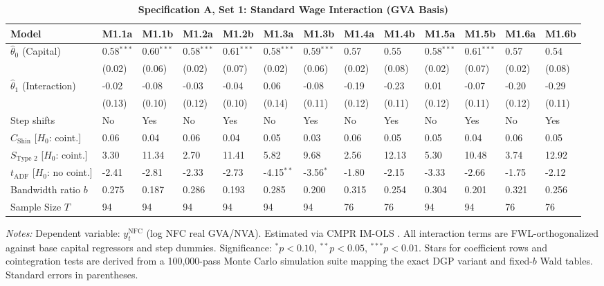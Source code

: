 \FloatBarrier
\begin{table}[h!]
\centering
\caption{\textbf{Specification A, Set 1: Standard Wage Interaction (GVA Basis)}}
\label{tab:specA_set1_gva_app}
\tiny
\setlength{\tabcolsep}{1.5pt}
\begin{tabular}{p{3.2cm}p{1.0cm}p{1.0cm}p{1.0cm}p{1.0cm}p{1.0cm}p{1.0cm}p{1.0cm}p{1.0cm}p{1.0cm}p{1.0cm}p{1.0cm}p{1.0cm}}
\toprule
Model & M1.1a & M1.1b & M1.2a & M1.2b & M1.3a & M1.3b & M1.4a & M1.4b & M1.5a & M1.5b & M1.6a & M1.6b \\
\midrule
$\hat{\theta}_0$ (Capital) & 0.58$^{***}$ & 0.60$^{***}$ & 0.58$^{***}$ & 0.61$^{***}$ & 0.58$^{***}$ & 0.59$^{***}$ & 0.57 & 0.55 & 0.58$^{***}$ & 0.61$^{***}$ & 0.57 & 0.54 \\
 & (0.02) & (0.06) & (0.02) & (0.07) & (0.02) & (0.06) & (0.02) & (0.08) & (0.02) & (0.07) & (0.02) & (0.08) \\
$\hat{\theta}_1$ (Interaction) & -0.02 & -0.08 & -0.03 & -0.04 & 0.06 & -0.08 & -0.19 & -0.23 & 0.01 & -0.07 & -0.20 & -0.29 \\
 & (0.13) & (0.10) & (0.12) & (0.10) & (0.14) & (0.11) & (0.12) & (0.11) & (0.12) & (0.11) & (0.12) & (0.11) \\
\midrule
Step shifts & No & Yes & No & Yes & No & Yes & No & Yes & No & Yes & No & Yes \\
$C_{\text{Shin}}$ [$H_0$: coint.] & 0.06 & 0.04 & 0.06 & 0.04 & 0.05 & 0.03 & 0.06 & 0.05 & 0.05 & 0.04 & 0.06 & 0.05 \\
$S_{\text{Type 2}}$ [$H_0$: coint.] & 3.30 & 11.34 & 2.70 & 11.41 & 5.82 & 9.68 & 2.56 & 12.13 & 5.30 & 10.48 & 3.74 & 12.92 \\
$t_{\text{ADF}}$ [$H_0$: no coint.] & -2.41 & -2.81 & -2.33 & -2.73 & -4.15$^{**}$ & -3.56$^{*}$ & -1.80 & -2.15 & -3.33 & -2.66 & -1.75 & -2.12 \\
Bandwidth ratio $b$ & 0.275 & 0.187 & 0.286 & 0.193 & 0.285 & 0.200 & 0.315 & 0.254 & 0.304 & 0.201 & 0.321 & 0.256 \\
Sample Size $T$ & 94 & 94 & 94 & 94 & 94 & 94 & 76 & 76 & 94 & 94 & 76 & 76 \\
\bottomrule
\end{tabular}
\begin{minipage}{\textwidth}
\scriptsize
\textit{Notes:} Dependent variable: $y_t^{\text{NFC}}$ (log NFC real GVA/NVA). Estimated via CMPR IM-OLS \citep{VogelsangWagner2014}. All interaction terms are FWL-orthogonalized against base capital regressors and step dummies. Significance: $^*p<0.10$, $^{**}p<0.05$, $^{***}p<0.01$. Stars for coefficient rows and cointegration tests are derived from a 100,000-pass Monte Carlo simulation suite mapping the exact DGP variant and fixed-$b$ Wald tables. Standard errors in parentheses.
\end{minipage}
\end{table}

